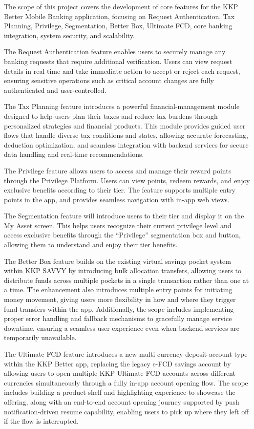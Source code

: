 \documentclass[12pt,oneside,openright,a4paper]{cpe-english-project}
\begin{document}
The scope of this project covers the development of core features for
the KKP Better Mobile Banking application, focusing on Request
Authentication, Tax Planning, Privilege, Segmentation, Better Box,
Ultimate FCD, core banking integration, system security, and
scalability.

The Request Authentication feature enables users to securely manage any
banking requests that require additional verification. Users can view
request details in real time and take immediate action to accept or
reject each request, ensuring sensitive operations such as critical
account changes are fully authenticated and user-controlled.

The Tax Planning feature introduces a powerful financial-management
module designed to help users plan their taxes and reduce tax burdens
through personalized strategies and financial products. This module
provides guided user flows that handle diverse tax conditions and
states, allowing accurate forecasting, deduction optimization, and
seamless integration with backend services for secure data handling and
real-time recommendations.

The Privilege feature allows users to access and manage their reward
points through the Privilege Platform. Users can view points, redeem
rewards, and enjoy exclusive benefits according to their tier. The
feature supports multiple entry points in the app, and provides seamless
navigation with in-app web views.

The Segmentation feature will introduce users to their tier and display
it on the My Asset screen. This helps users recognize their current
privilege level and access exclusive benefits through the ``Privilege''
segmentation box and button, allowing them to understand and enjoy their
tier benefits.

The Better Box feature builds on the existing virtual savings pocket
system within KKP SAVVY by introducing bulk allocation transfers,
allowing users to distribute funds across multiple pockets in a single
transaction rather than one at a time. The enhancement also introduces
multiple entry points for initiating money movement, giving users more
flexibility in how and where they trigger fund transfers within the app.
Additionally, the scope includes implementing proper error handling and
fallback mechanisms to gracefully manage service downtime, ensuring a
seamless user experience even when backend services are temporarily
unavailable.

The Ultimate FCD feature introduces a new multi-currency deposit account
type within the KKP Better app, replacing the legacy e-FCD savings
account by allowing users to open multiple KKP Ultimate FCD accounts
across different currencies simultaneously through a fully in-app
account opening flow. The scope includes building a product shelf and
highlighting experience to showcase the offering, along with an
end-to-end account opening journey supported by push notification-driven
resume capability, enabling users to pick up where they left off if the
flow is interrupted.
\end{document}
